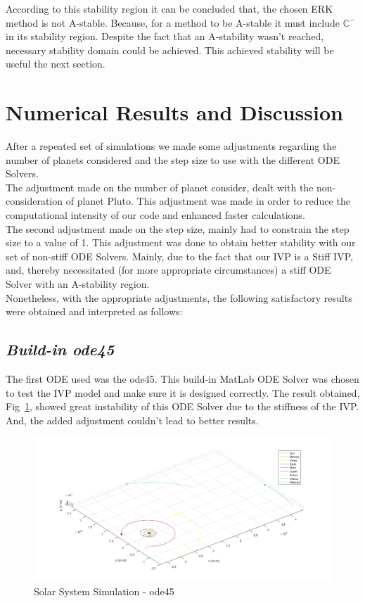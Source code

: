 \documentclass[a4paper]{article}
\begin{document}
According to this stability region it can be concluded that, the chosen ERK method is not A-stable. Because, for a method to be A-stable it must include $\mathbb{C}^{-}$ in its stability region. Despite the fact that an 
A-stability wasn't reached, necessary stability domain could be achieved. This achieved stability will be useful the next section.

\pagebreak

\section{Numerical Results and Discussion}
After a repeated set of simulations we made some adjustments regarding the number of planets considered and the step size to use with the different ODE Solvers.\\

The adjustment made on the number of planet consider, dealt with the non-consideration of planet Pluto. This adjustment was made in order to reduce the computational intensity of our code and enhanced faster calculations.\\

The second adjustment made on the step size, mainly had to constrain the step size to a value of 1. This adjustment was done to obtain better stability with our set of non-stiff ODE Solvers. Mainly, due to the fact that our IVP is a Stiff IVP, and, thereby necessitated (for more appropriate circumstances) a stiff ODE Solver with an A-stability region.\\

Nonetheless, with the appropriate adjustments, the following satisfactory results were obtained and interpreted as follows: \\


\subsection{\textit{Build-in ode45}}

The first ODE used was the ode45. This build-in MatLab ODE Solver was chosen to test the IVP model and make sure it is designed correctly. The result obtained, Fig~\ref{fig:Solar_System_-_ode45}, showed great instability of this ODE Solver due to the stiffness of the IVP. And, the added adjustment couldn't lead to better results.

\begin{figure}[H]
\centering
\includegraphics[width=1\textwidth]{Solar_System_-_ode45.png}
\caption{Solar System Simulation - ode45}
\label{fig:Solar_System_-_ode45}
\end{figure}
\end{document}
